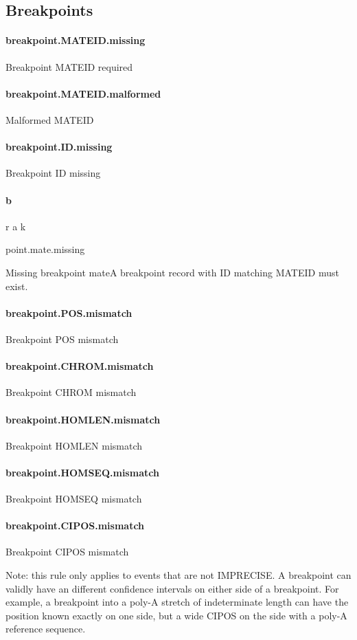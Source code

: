 \documentclass[10pt]{article}
\newcommand{\vcfstrictrule}[5]{
	\paragraph{#1} #2 #4	
	#5
	\par
}
\begin{document}
\subsection { Breakpoints }
\vcfstrictrule{breakpoint.MATEID.missing}{Breakpoint MATEID required}{Breakpoint record must have MATEID specified.}{}{}
\vcfstrictrule{breakpoint.MATEID.malformed}{Malformed MATEID}{MATEID cannot be the MISSING value.}{}{}
\vcfstrictrule{breakpoint.ID.missing}{Breakpoint ID missing}{Breakpoint ID cannot be the MISSING value \tt{.}.}
\vcfstrictrule{breakpoint.mate.missing}{Missing breakpoint mate}{A breakpoint record with ID matching MATEID must exist.}{}{}
\vcfstrictrule{breakpoint.POS.mismatch}{Breakpoint POS mismatch}{The POS of the matching breakpoint record does not match the position in the ALT field}{}{}
\vcfstrictrule{breakpoint.CHROM.mismatch}{Breakpoint CHROM mismatch}{The CHROM of the matching breakpoint record does not match the contig in the ALT field}{}{}
\vcfstrictrule{breakpoint.HOMLEN.mismatch}{Breakpoint HOMLEN mismatch}{The HOMLEN of the matching breakpoint record does not match the HOMLEN of this record.}{}{}
\vcfstrictrule{breakpoint.HOMSEQ.mismatch}{Breakpoint HOMSEQ mismatch}{After adjusting for breakend orientations, the HOMSEQ of the matching breakpoint record does not match the HOMSEQ of this record.}{}{}
\vcfstrictrule{breakpoint.CIPOS.mismatch}{Breakpoint CIPOS mismatch}{After adjusting for breakend orientations, the CIPOS of the matching breakpoint record does not match the CIPOS of this record.}{}{
Note: this rule only applies to events that are not IMPRECISE.
A breakpoint can validly have an different confidence intervals on either side of a breakpoint.
For example, a breakpoint into a poly-A stretch of indeterminate length can have the position known exactly on one side, but a wide CIPOS on the side with a poly-A reference sequence.
}
\end{document}
